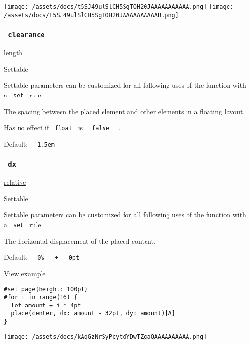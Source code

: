 \texttt{[image: /assets/docs/t5SJ49ulSlCH5SgTOH20JAAAAAAAAAAA.png]}
\texttt{[image: /assets/docs/t5SJ49ulSlCH5SgTOH20JAAAAAAAAAAB.png]}

\subsubsection{\texorpdfstring{\texttt{\ clearance\ }}{ clearance }}\label{parameters-clearance}

\href{/docs/reference/layout/length/}{length}

{{ Settable }}

\label{parameters-clearance-settable-tooltip}
Settable parameters can be customized for all following uses of the
function with a \texttt{\ set\ } rule.

The spacing between the placed element and other elements in a floating
layout.

Has no effect if \texttt{\ float\ } is
\texttt{\ }{\texttt{\ false\ }}\texttt{\ } .

Default: \texttt{\ }{\texttt{\ 1.5em\ }}\texttt{\ }

\subsubsection{\texorpdfstring{\texttt{\ dx\ }}{ dx }}\label{parameters-dx}

\href{/docs/reference/layout/relative/}{relative}

{{ Settable }}

\label{parameters-dx-settable-tooltip}
Settable parameters can be customized for all following uses of the
function with a \texttt{\ set\ } rule.

The horizontal displacement of the placed content.

Default:
\texttt{\ }{\texttt{\ 0\%\ }}\texttt{\ }{\texttt{\ +\ }}\texttt{\ }{\texttt{\ 0pt\ }}\texttt{\ }


View example

\begin{verbatim}
#set page(height: 100pt)
#for i in range(16) {
  let amount = i * 4pt
  place(center, dx: amount - 32pt, dy: amount)[A]
}
\end{verbatim}

\texttt{[image: /assets/docs/kAqGzNrSyPcytdYDwTZgaQAAAAAAAAAA.png]}

